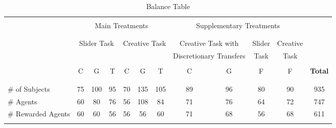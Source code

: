 \begin{landscape}
\begin{table}\caption{Balance Table}
\begin{center}%
{\small\renewcommand{\arraystretch}{0.6}
\begin{tabular}[t]{|l|c|c|c|c|c|c||c|c|c|c||c|} \cline{2-11}
 \multicolumn{1}{c|}{} & \multicolumn{6}{c||}{} &  \multicolumn{4}{c||}{} & \multicolumn{1}{c}{} \\
 \multicolumn{1}{c|}{} & \multicolumn{6}{c||}{Main Treatments} &  \multicolumn{4}{c||}{Supplementary Treatments} &\multicolumn{1}{c}{} \\
 \multicolumn{1}{c|}{} & \multicolumn{6}{c||}{} &  \multicolumn{4}{c||}{} &\multicolumn{1}{c}{} \\
\cline{2-11}
 \multicolumn{1}{c|}{} & \multicolumn{3}{c}{} &  \multicolumn{3}{|c||}{} & \multicolumn{2}{c|}{} & \multicolumn{1}{c|}{} & \multicolumn{1}{c||}{} &\multicolumn{1}{c}{} \\
 \multicolumn{1}{c|}{} & \multicolumn{3}{c}{Slider Task} & \multicolumn{3}{|c||}{Creative Task} &  \multicolumn{2}{c|}{Creative Task with} & \multicolumn{1}{c|}{Slider} &  \multicolumn{1}{c||}{Creative}  &  \multicolumn{1}{c}{}\\
 \multicolumn{1}{c|}{}& \multicolumn{3}{c}{} &  \multicolumn{3}{|c||}{}  &   \multicolumn{2}{c|}{Discretionary Transfers} & \multicolumn{1}{c|}{Task} & \multicolumn{1}{c||}{Task}\\
\cline{2-12}
\multicolumn{1}{c|}{} &   &   &   &   &   &   &   &   &   &   &  \\
\multicolumn{1}{c|}{} 	&	 C 	&	 G 	&	 T 	&	 C 	&	 G 	&	 T 	&	\hspace{14pt} C \hspace{14pt}	&	 G 	&	 F 	&	 F 	&	 \bf Total \\
\multicolumn{1}{c|}{} 	&	   	&	   	&	   	&	   	&	   	&	   	&	   	&	   	&	   	&	   	&	 \\
\cline{2-12}\hline																									
	&	    	&	     	&	    	&	    	&	     	&	     	&	    	&	    	&	     	&	    	&	    \\
\# of Subjects 	&	 75 	&	 100 	&	 95 	&	 70 	&	 135 	&	 105 		&	  89 	&	 96  &	 80 	&	 90 	& 935 \\
\# Agents  	&	 60 	&	 80 	&	 76 	&	 56 	&	 108  	&	 84 	 	&	71 	&	 76 &	 64 	&	 72 	& 747 \\
\# Rewarded Agents 	&	 60 	&	 60 	&	 56 	&	 56 	&	 56 	&	 60 		&	  71 	&	 68 &	 56 	&	 68 	&	611\\
 	&	 	&	 	&	 	&	 	&	 	&	 	&	 	&	 	&	 	&	 	&	 		\\

\end{tabular}}
\end{center}
\end{table}
\end{landscape}
